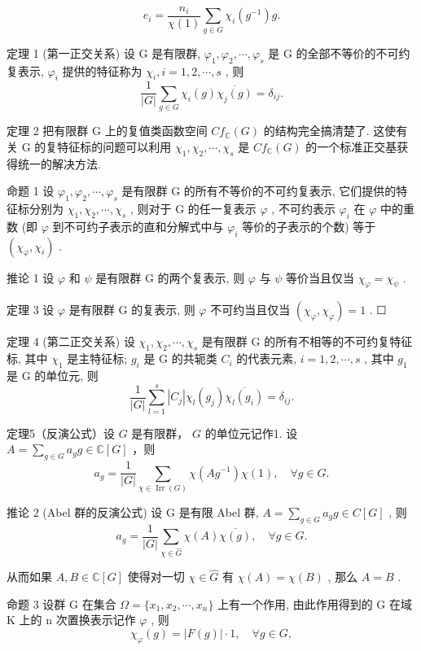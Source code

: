 \documentclass[]{article}
\begin{document}
$$
e _ {i} = \frac {n _ {i}}{\chi (1)} \sum_ {g \in G} \chi_ {i} (g ^ {- 1}) g. 
$$

定理 1 (第一正交关系) 设 G 是有限群, $\varphi_{1}, \varphi_{2}, \cdots, \varphi_{s}$ 是 G 的全部不等价的不可约复表示, $\varphi_{i}$ 提供的特征称为 $\chi_{i}, i = 1, 2, \cdots, s$ , 则 $$
\frac {1}{| G |} \sum_ {g \in G} \chi_ {i} (g) \overline {{\chi_ {j} (g)}} = \delta_ {i j}. 
$$

定理 2 把有限群 G 上的复值类函数空间 $Cf_{\mathbb{C}}(G)$ 的结构完全搞清楚了. 这使有关 G 的复特征标的问题可以利用 $\chi_{1}, \chi_{2}, \cdots, \chi_{s}$ 是 $Cf_{\mathbb{C}}(G)$ 的一个标准正交基获得统一的解决方法. 

命题 1 设 $\varphi_{1},\varphi_{2},\cdots,\varphi_{s}$ 是有限群 G 的所有不等价的不可约复表示, 它们提供的特征标分别为 $\chi_{1},\chi_{2},\cdots,\chi_{s}$ , 则对于 G 的任一复表示 $\varphi$ , 不可约表示 $\varphi_{i}$ 在 $\varphi$ 中的重数 (即 $\varphi$ 到不可约子表示的直和分解式中与 $\varphi_{i}$ 等价的子表示的个数) 等于 $(\chi_{\varphi},\chi_{i})$ . 

推论 1 设 $\varphi$ 和 $\psi$ 是有限群 G 的两个复表示, 则 $\varphi$ 与 $\psi$ 等价当且仅当 $\chi_{\varphi} = \chi_{\psi}$ . 

定理 3 设 $\varphi$ 是有限群 G 的复表示, 则 $\varphi$ 不可约当且仅当 $(\chi_{\varphi}, \chi_{\varphi}) = 1$ . ☐ 

定理 4 (第二正交关系) 设 $\chi_{1}, \chi_{2}, \cdots, \chi_{s}$ 是有限群 G 的所有不相等的不可约复特征标, 其中 $\chi_{1}$ 是主特征标; $g_{i}$ 是 G 的共轭类 $C_{i}$ 的代表元素, $i = 1, 2, \cdots, s$ , 其中 $g_{1}$ 是 G 的单位元, 则$$
\frac {1}{| G |} \sum_ {l = 1} ^ {s} | C _ {j} | \chi_ {l} (g _ {j}) \overline {{\chi_ {l} (g _ {i})}} = \delta_ {i j}. 
$$ 

定理5（反演公式）设 $G$ 是有限群， $G$ 的单位元记作1. 设 $A = \sum_{g \in G} a_g g \in \mathbb{C}[G]$ ，则 $$
a _ {g} = \frac {1}{| G |} \sum_ {\chi \in \operatorname{Irr} (G)} \chi (A g ^ {- 1}) \chi (1), \quad \forall g \in G. 
$$

推论 2 (Abel 群的反演公式) 设 G 是有限 Abel 群, $A = \sum_{g \in G} a_g g \in C[G]$ , 则 $$
a _ {g} = \frac {1}{| G |} \sum_ {\chi \in \widehat {G}} \chi (A) \overline {{\chi (g)}}, \quad \forall g \in G. 
$$

从而如果 $A, B \in \mathbb{C}[G]$ 使得对一切 $\chi \in \widehat{G}$ 有 $\chi(A) = \chi(B)$ , 那么 $A = B$ . 

命题 3 设群 G 在集合 $\Omega = \{x_{1}, x_{2}, \cdots, x_{n}\}$ 上有一个作用, 由此作用得到的 G 在域 K 上的 n 次置换表示记作 $\varphi$ , 则 $$
\chi_ {\varphi} (g) = | F (g) | \cdot 1, \quad \forall g \in G, 
$$
\end{document}
